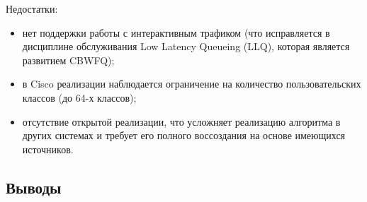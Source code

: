 	Недостатки:
	\begin{itemize}
		\item нет поддержки работы с интерактивным трафиком (что исправляется в дисциплине обслуживания Low Latency Queueing (LLQ),
		которая является развитием CBWFQ);
		\item в Cisco реализации наблюдается ограничение на количество пользовательских классов (до 64-х классов);\cite{Vagesna}
		\item отсутствие открытой реализации, что усложняет реализацию алгоритма в других системах и требует его полного воссоздания
		на основе имеющихся источников.
	\end{itemize}

	\subsection{Выводы}

